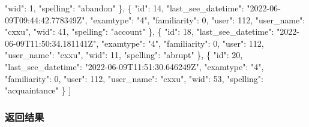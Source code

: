 \documentclass[
]{article}
\newenvironment{Shaded}{}{}
\newcommand{\DataTypeTok}[1]{\textcolor[rgb]{0.56,0.13,0.00}{#1}}
\newcommand{\DecValTok}[1]{\textcolor[rgb]{0.25,0.63,0.44}{#1}}
\newcommand{\FunctionTok}[1]{\textcolor[rgb]{0.02,0.16,0.49}{#1}}
\newcommand{\OtherTok}[1]{\textcolor[rgb]{0.00,0.44,0.13}{#1}}
\newcommand{\StringTok}[1]{\textcolor[rgb]{0.25,0.44,0.63}{#1}}
\begin{document}
\begin{Shaded}
\begin{Highlighting}[]
    \DataTypeTok{"wid"}\FunctionTok{:} \DecValTok{1}\FunctionTok{,}
    \DataTypeTok{"spelling"}\FunctionTok{:} \StringTok{"abandon"}
  \FunctionTok{\}}\OtherTok{,}
  \FunctionTok{\{}
    \DataTypeTok{"id"}\FunctionTok{:} \DecValTok{14}\FunctionTok{,}
    \DataTypeTok{"last\_see\_datetime"}\FunctionTok{:} \StringTok{"2022{-}06{-}09T09:44:42.778349Z"}\FunctionTok{,}
    \DataTypeTok{"examtype"}\FunctionTok{:} \StringTok{"4"}\FunctionTok{,}
    \DataTypeTok{"familiarity"}\FunctionTok{:} \DecValTok{0}\FunctionTok{,}
    \DataTypeTok{"user"}\FunctionTok{:} \DecValTok{112}\FunctionTok{,}
    \DataTypeTok{"user\_name"}\FunctionTok{:} \StringTok{"cxxu"}\FunctionTok{,}
    \DataTypeTok{"wid"}\FunctionTok{:} \DecValTok{41}\FunctionTok{,}
    \DataTypeTok{"spelling"}\FunctionTok{:} \StringTok{"account"}
  \FunctionTok{\}}\OtherTok{,}
  \FunctionTok{\{}
    \DataTypeTok{"id"}\FunctionTok{:} \DecValTok{18}\FunctionTok{,}
    \DataTypeTok{"last\_see\_datetime"}\FunctionTok{:} \StringTok{"2022{-}06{-}09T11:50:34.181141Z"}\FunctionTok{,}
    \DataTypeTok{"examtype"}\FunctionTok{:} \StringTok{"4"}\FunctionTok{,}
    \DataTypeTok{"familiarity"}\FunctionTok{:} \DecValTok{0}\FunctionTok{,}
    \DataTypeTok{"user"}\FunctionTok{:} \DecValTok{112}\FunctionTok{,}
    \DataTypeTok{"user\_name"}\FunctionTok{:} \StringTok{"cxxu"}\FunctionTok{,}
    \DataTypeTok{"wid"}\FunctionTok{:} \DecValTok{11}\FunctionTok{,}
    \DataTypeTok{"spelling"}\FunctionTok{:} \StringTok{"abrupt"}
  \FunctionTok{\}}\OtherTok{,}
  \FunctionTok{\{}
    \DataTypeTok{"id"}\FunctionTok{:} \DecValTok{20}\FunctionTok{,}
    \DataTypeTok{"last\_see\_datetime"}\FunctionTok{:} \StringTok{"2022{-}06{-}09T11:51:30.646249Z"}\FunctionTok{,}
    \DataTypeTok{"examtype"}\FunctionTok{:} \StringTok{"4"}\FunctionTok{,}
    \DataTypeTok{"familiarity"}\FunctionTok{:} \DecValTok{0}\FunctionTok{,}
    \DataTypeTok{"user"}\FunctionTok{:} \DecValTok{112}\FunctionTok{,}
    \DataTypeTok{"user\_name"}\FunctionTok{:} \StringTok{"cxxu"}\FunctionTok{,}
    \DataTypeTok{"wid"}\FunctionTok{:} \DecValTok{53}\FunctionTok{,}
    \DataTypeTok{"spelling"}\FunctionTok{:} \StringTok{"acquaintance"}
  \FunctionTok{\}}
\OtherTok{]}
\end{Highlighting}
\end{Shaded}

\hypertarget{ux8fd4ux56deux7ed3ux679c-46}{%
\subsubsection{返回结果}\label{ux8fd4ux56deux7ed3ux679c-46}}
\end{document}
